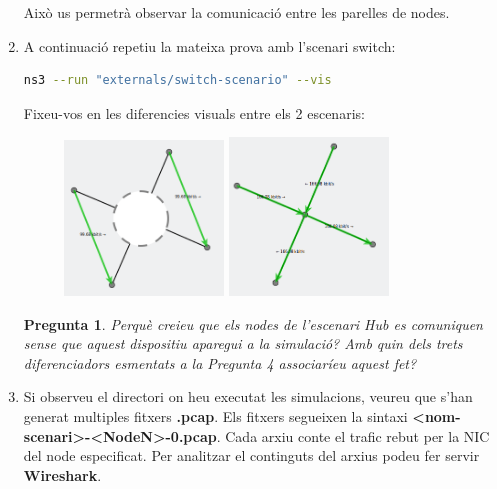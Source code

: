 \documentclass[12pt,a4paper]{article}
\newcounter{exercises}
\newtheorem{exer}[exercises]{Pregunta}
\begin{document}
\begin{enumerate}
Això us permetrà observar la comunicació entre les parelles de nodes.

\item A continuació repetiu la mateixa prova amb l'scenari switch:
\begin{lstlisting}[language=bash]
   ns3 --run "externals/switch-scenario" --vis
\end{lstlisting}

Fixeu-vos en les diferencies visuals entre els 2 escenaris:
\begin{figure}[!ht]
  \begin{center}
    \includegraphics[width=0.4\textwidth]{hub-coms}
    \includegraphics[width=0.4\textwidth]{switch-coms}    
    \label{ns3}
  \end{center}
\end{figure}
\begin{exer} Perquè creieu que els nodes de l'escenari Hub es comuniquen sense que aquest dispositiu aparegui a la simulació? Amb quin dels trets diferenciadors esmentats a la Pregunta 4 associaríeu aquest fet? \end{exer}

\item Si observeu el directori on heu executat les simulacions, veureu que s'han generat multiples fitxers \textbf{.pcap}. Els fitxers segueixen la sintaxi \textbf{<nom-scenari>-<NodeN>-0.pcap}. Cada arxiu conte el trafic rebut per la NIC del node especificat. Per analitzar el continguts del arxius podeu fer servir \textbf{Wireshark}. 


\end{enumerate}
\end{document}

